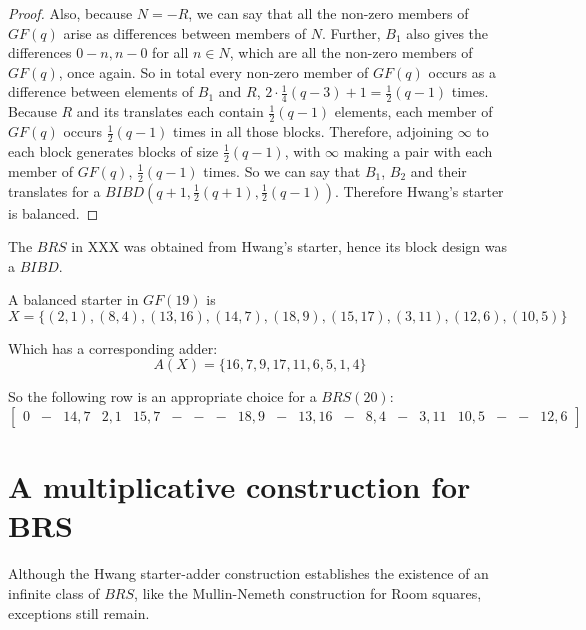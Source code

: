 \documentclass[
  11pt,
  a4paper]{book}\usepackage[]{graphicx}\usepackage[]{xcolor}
\newcounter{example}
\begin{document}
\begin{proof}
Also, because $N = -R$, we can say that all the non-zero
members of $GF(q)$ arise as differences between members of
$N$. Further, $B_1$ also gives the differences
$0 - n, n - 0$ for all $n\in N$, which are all the non-zero
members
of $GF(q)$, once again. So in total every non-zero member of
$GF(q)$ occurs as a difference between elements of $B_1$ and
$R$, $2 \cdot \frac{1}{4}(q - 3) + 1 = \frac{1}{2} (q - 1)$
times.  Because $R$ and its translates each contain
$\frac{1}{2}(q - 1)$ elements, each member of $GF(q)$ occurs
$\frac{1}{2}(q - 1)$ times in all those blocks. Therefore,
adjoining $\infty$ to each block generates blocks of size
$\frac{1}{2}(q - 1)$, with $\infty$ making a pair with each
member of $GF(q)$, $\frac{1}{2}(q - 1)$ times.  So we can say
that $B_1$, $B_2$ and their translates for a
$BIBD(q  +1, \frac{1}{2}(q + 1), \frac{1}{2}(q - 1))$.
Therefore Hwang’s starter is balanced. 
\end{proof}

The $BRS$ in XXX was obtained from Hwang’s starter,
hence its block design was a $BIBD$.

\begin{example}
A balanced starter in $GF(19)$ is
\begin{equation}
X = \{(2,1),(8,4),(13,16),(14,7),(18,9),(15,17),(3,11),(12,6),(10,5)\}
\end{equation}

Which has a corresponding adder:
\begin{equation}
A(X) = \{16,7,9,17,11,6,5,1,4\}
\end{equation}

So the following row is an appropriate choice for a
$BRS(20)$:
\begin{equation}
 \begin{bmatrix}
   0 & - & 14,7 & 2,1 & 15,7 & - & - & - & 18,9 & - & 13,16 & - & 8,4 & - & 3,11 & 10,5 & - & - & 12,6
 \end{bmatrix}
\end{equation}

\end{example}

\section{A multiplicative construction for BRS}

Although the Hwang starter-adder construction establishes
the existence of an infinite class of $BRS$, like the
Mullin-Nemeth construction for Room squares, exceptions still
remain.
\end{document}
